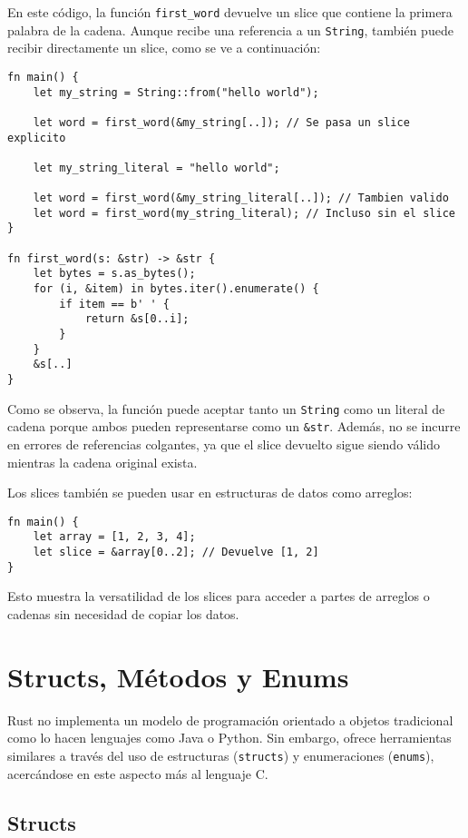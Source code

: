 \documentclass[12pt]{article}
\begin{document}
En este código, la función \texttt{first\_word} devuelve un slice que contiene la primera palabra de la cadena. Aunque recibe una referencia a un \texttt{String}, también puede recibir directamente un slice, como se ve a continuación:

\begin{lstlisting}[style=ruststyle]
fn main() {
	let my_string = String::from("hello world");

	let word = first_word(&my_string[..]); // Se pasa un slice explicito

	let my_string_literal = "hello world";

	let word = first_word(&my_string_literal[..]); // Tambien valido
	let word = first_word(my_string_literal); // Incluso sin el slice
}

fn first_word(s: &str) -> &str {
	let bytes = s.as_bytes();
	for (i, &item) in bytes.iter().enumerate() {
		if item == b' ' {
			return &s[0..i];
		}
	}
	&s[..]
}
\end{lstlisting}

Como se observa, la función puede aceptar tanto un \texttt{String} como un literal de cadena porque ambos pueden representarse como un \texttt{\&str}. Además, no se incurre en errores de referencias colgantes, ya que el slice devuelto sigue siendo válido mientras la cadena original exista.

Los slices también se pueden usar en estructuras de datos como arreglos:

\begin{lstlisting}[style=ruststyle]
fn main() {
	let array = [1, 2, 3, 4];
	let slice = &array[0..2]; // Devuelve [1, 2]
}
\end{lstlisting}

Esto muestra la versatilidad de los slices para acceder a partes de arreglos o cadenas sin necesidad de copiar los datos.

\section{Structs, Métodos y Enums}

Rust no implementa un modelo de programación orientado a objetos tradicional como lo hacen lenguajes como Java o Python. Sin embargo, ofrece herramientas similares a través del uso de estructuras (\texttt{structs}) y enumeraciones (\texttt{enums}), acercándose en este aspecto más al lenguaje C.

\subsection{Structs}
\end{document}

